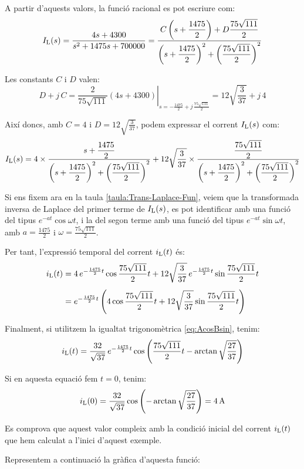 \begin{exemple}
    A partir d'aquests valors, la  funció racional es pot escriure com:
    \[
        I_\mathrm{L}(s) =
        \frac{4 s+ 4300}{s^2 +1475 s + 700000} =
        \frac{C\left(s+\dfrac{1475}{2}\right)+D\dfrac{75\sqrt{111}}{2}}
        {\left(s+\dfrac{1475}{2}\right)^2+\left(\dfrac{75\sqrt{111}}{2}\right)^2}
    \]

    Les constants $C$ i $D$ valen:
    \[
    D + j\,C = \left.\frac{2}{75\sqrt{111}}(4 s
    +4300)\right|_{s=-\frac{1475}{2} + j\,\frac{75\sqrt{111}}{2}}=
    12\sqrt{\frac{3}{37}} +j\,4
    \]

    Així doncs, amb $C=4$ i $D=12\sqrt{\frac{3}{37}}$, podem expressar
    el corrent $I_\mathrm{L}(s)$ com:
    \[
        I_\mathrm{L}(s) = 4\times\frac{s+\dfrac{1475}{2}}
        {\left(s+\dfrac{1475}{2}\right)^2+\left(\dfrac{75\sqrt{111}}{2}\right)^2}
        + 12\sqrt{\frac{3}{37}}\times\frac{\dfrac{75\sqrt{111}}{2}}
        {\left(s+\dfrac{1475}{2}\right)^2+\left(\dfrac{75\sqrt{111}}{2}\right)^2}
    \]


     Si ens fixem ara en la taula \vref{taula:Trans-Laplace-Fun},
    veiem que la transformada inversa de Laplace del primer terme de
    $I_\mathrm{L}(s)$, es pot identificar amb una funció del tipus
    $e^{-at}\cos\omega t$, i la del segon terme amb una funció del tipus
    $e^{-at}\sin\omega t$, amb $a=\frac{1475}{2}$ i
    $\omega=\frac{75\sqrt{111}}{2}$.

    Per tant, l'expressió temporal del corrent $i_\mathrm{L}(t)$ és:
    \[\begin{split}
        i_\mathrm{L}(t) &= 4\, e^{-\frac{1475}{2}t} \cos \frac{75\sqrt{111}}{2} t +
        12\sqrt{\frac{3}{37}}\, e^{-\frac{1475}{2}t} \sin
        \frac{75\sqrt{111}}{2}t  \\[1ex] &= e^{-\frac{1475}{2}t} \left( 4
        \cos \frac{75\sqrt{111}}{2} t + 12\sqrt{\frac{3}{37}}\sin
        \frac{75\sqrt{111}}{2}t\right)
    \end{split}\]

    Finalment, si utilitzem la igualtat trigonomètrica
    \eqref{eq:AcosBsin}, tenim:
    \[
    i_\mathrm{L}(t) = \frac{32}{\sqrt{37}}\,e^{-\frac{1475}{2}t}
    \cos\left(\frac{75\sqrt{111}}{2} t - \arctan
    \sqrt{\frac{27}{37}}\right)
    \]

    Si en aquesta equació fem $t=0$, tenim:
    \[
        i_\mathrm{L}(0) = \frac{32}{\sqrt{37}} \cos\left( - \arctan
    \sqrt{\frac{27}{37}}\right) = \qty{4}{A}
    \]

    Es comprova que aquest valor compleix amb la condició inicial del
    corrent $i_\mathrm{L}(t)$ que hem calculat a l'inici d'aquest exemple.

    Representem a continuació la gràfica d'aquesta funció:

    \begin{center}
        
    \end{center}
\end{exemple}

